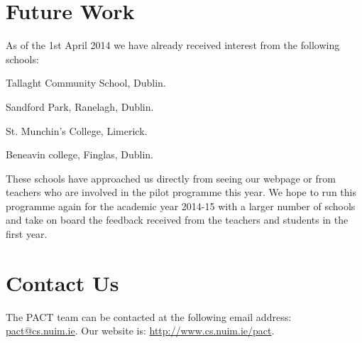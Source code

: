 \documentclass[a4paper]{article}
\begin{document}
\section{Future Work}
As of the 1st April 2014 we have already received interest from the following schools:
\begin{compactitem}
  \item Tallaght Community School, Dublin. 
  \item Sandford Park, Ranelagh, Dublin.
  \item St. Munchin's College, Limerick.
  \item Beneavin college, Finglas, Dublin.
\end{compactitem}

These schools have approached us directly from seeing our webpage or from teachers who are involved in the pilot programme this year. We hope to run this programme again for the academic year 2014-15 with a larger number of schools and take on board the feedback received from the teachers and students in the first year.

\section{Contact Us}
The PACT team can be contacted at the following email address: \url{pact@cs.nuim.ie}.
Our website is: \url{http://www.cs.nuim.ie/pact}.



\end{document}
